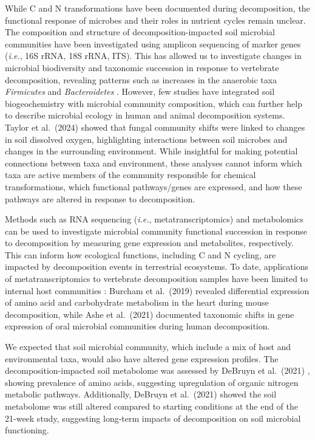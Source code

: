 \documentclass[
  sn-nature,
  lineno, referee]{sn-jnl}
\begin{document}
While C and N transformations have been documented during decomposition,
the functional response of microbes and their roles in nutrient cycles
remain unclear. The composition and structure of decomposition-impacted
soil microbial communities have been investigated using amplicon
sequencing of marker genes (\emph{i.e.}, 16S rRNA, 18S rRNA, ITS). This
has allowed us to investigate changes in microbial biodiversity and
taxonomic succession in response to vertebrate decomposition, revealing
patterns such as increases in the anaerobic taxa \emph{Firmicutes} and
\emph{Bacteroidetes} \citep{mason_microbial_2023}. However, few studies
have integrated soil biogeochemistry with microbial community
composition, which can further help to describe microbial ecology in
human and animal decomposition systems. Taylor et al.~(2024)
\citep{taylor_transient_2024} showed that fungal community shifts were
linked to changes in soil dissolved oxygen, highlighting interactions
between soil microbes and changes in the surrounding environment. While
insightful for making potential connections between taxa and
environment, these analyses cannot inform which taxa are active members
of the community responsible for chemical transformations, which
functional pathways/genes are expressed, and how these pathways are
altered in response to decomposition.

Methods such as RNA sequencing (\emph{i.e.}, metatranscriptomics) and
metabolomics can be used to investigate microbial community functional
succession in response to decomposition by measuring gene expression and
metabolites, respectively. This can inform how ecological functions,
including C and N cycling, are impacted by decomposition events in
terrestrial ecosystems. To date, applications of metatranscriptomics to
vertebrate decomposition samples have been limited to internal host
communities \citep{burcham_total_2019, ashe_characterization_2021}:
Burcham et al.~(2019) \citep{burcham_total_2019} revealed differential
expression of amino acid and carbohydrate metabolism in the heart during
mouse decomposition, while Ashe et al.~(2021)
\citep{ashe_characterization_2021} documented taxonomic shifts in gene
expression of oral microbial communities during human decomposition.

We expected that soil microbial community, which include a mix of host
and environmental taxa, would also have altered gene expression
profiles. The decomposition-impacted soil metabolome was assessed by
DeBruyn et al.~(2021) \citep{debruyn_comparative_2021}, showing
prevalence of amino acids, suggesting upregulation of organic nitrogen
metabolic pathways. Additionally, DeBruyn et al.~(2021)
\citep{debruyn_comparative_2021} showed the soil metabolome was still
altered compared to starting conditions at the end of the 21-week study,
suggesting long-term impacts of decomposition on soil microbial
functioning.
\end{document}
